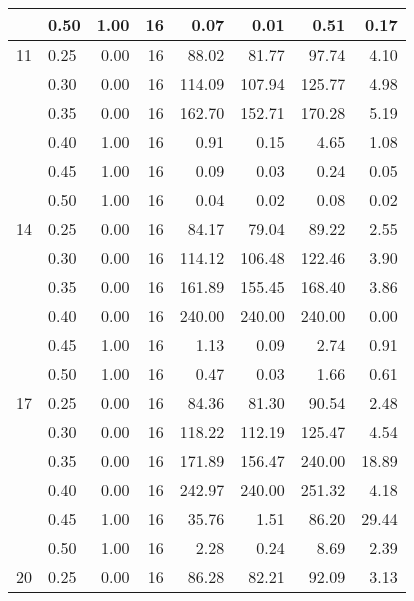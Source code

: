 \documentclass[11pt]{article}
\begin{document}
\begin{table}
\begin{tabular}{llrrrrrr}
    & 0.50 &           1.00 &             16 &   0.07 &   0.01 &   0.51 &      0.17 \\
    \midrule
    11 & 0.25 &           0.00 &             16 &  88.02 &  81.77 &  97.74 &      4.10 \\
    & 0.30 &           0.00 &             16 & 114.09 & 107.94 & 125.77 &      4.98 \\
    & 0.35 &           0.00 &             16 & 162.70 & 152.71 & 170.28 &      5.19 \\
    & 0.40 &           1.00 &             16 &   0.91 &   0.15 &   4.65 &      1.08 \\
    & 0.45 &           1.00 &             16 &   0.09 &   0.03 &   0.24 &      0.05 \\
    & 0.50 &           1.00 &             16 &   0.04 &   0.02 &   0.08 &      0.02 \\
    \midrule
    14 & 0.25 &           0.00 &             16 &  84.17 &  79.04 &  89.22 &      2.55 \\
    & 0.30 &           0.00 &             16 & 114.12 & 106.48 & 122.46 &      3.90 \\
    & 0.35 &           0.00 &             16 & 161.89 & 155.45 & 168.40 &      3.86 \\
    & 0.40 &           0.00 &             16 & 240.00 & 240.00 & 240.00 &      0.00 \\
    & 0.45 &           1.00 &             16 &   1.13 &   0.09 &   2.74 &      0.91 \\
    & 0.50 &           1.00 &             16 &   0.47 &   0.03 &   1.66 &      0.61 \\
    \midrule
    17 & 0.25 &           0.00 &             16 &  84.36 &  81.30 &  90.54 &      2.48 \\
    & 0.30 &           0.00 &             16 & 118.22 & 112.19 & 125.47 &      4.54 \\
    & 0.35 &           0.00 &             16 & 171.89 & 156.47 & 240.00 &     18.89 \\
    & 0.40 &           0.00 &             16 & 242.97 & 240.00 & 251.32 &      4.18 \\
    & 0.45 &           1.00 &             16 &  35.76 &   1.51 &  86.20 &     29.44 \\
    & 0.50 &           1.00 &             16 &   2.28 &   0.24 &   8.69 &      2.39 \\
    \midrule
    20 & 0.25 &           0.00 &             16 &  86.28 &  82.21 &  92.09 &      3.13 \\

\end{tabular}
\end{table}
\end{document}
